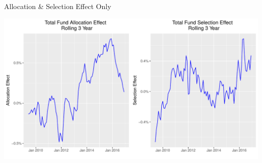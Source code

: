 \documentclass[10pt,english]{beamer}\usepackage[]{graphicx}\usepackage[]{color}
\makeatletter
\def\maxwidth{ %
  \ifdim\Gin@nat@width>\linewidth
    \linewidth
  \else
    \Gin@nat@width
  \fi
}
\newenvironment{knitrout}{}{} %
\makeatother
\begin{document}
%
\begin{frame}[fragile]{Allocation \& Selection Effect Only}

\begin{knitrout}
\color{fgcolor}
\includegraphics[width=\maxwidth]{figure/tf_breakdown-1} 

\end{knitrout}
\end{frame}
%
\end{document}
